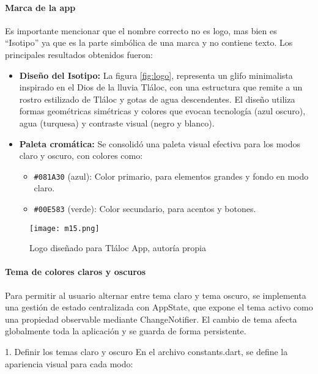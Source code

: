 \paragraph{Marca de la app}
Es importante mencionar que el nombre correcto no es logo, mas bien es ``Isotipo'' ya que es la parte simbólica de una marca y no contiene texto. Los principales resultados obtenidos fueron:

\begin{itemize}
  \item \textbf{Diseño del Isotipo:} La figura \ref{fig:logo}, representa un glifo minimalista inspirado en el Dios de la lluvia Tláloc, con una estructura que remite a un rostro estilizado de Tláloc y gotas de agua descendentes. El diseño utiliza formas geométricas simétricas y colores que evocan tecnología (azul oscuro), agua (turquesa) y contraste visual (negro y blanco).
  
  \item \textbf{Paleta cromática:} Se consolidó una paleta visual efectiva para los modos claro y oscuro, con colores como:
  \begin{itemize}
    \item \texttt{\#081A30} (azul): Color primario, para elementos grandes y fondo en modo claro.
    \item \texttt{\#00E583} (verde): Color secundario, para acentos y botones.
  \end{itemize} 
\end{itemize} 
\begin{figure}[h!]
\centering
  \texttt{[image: m15.png]}
  \caption{Logo diseñado para Tláloc App, autoría propia}
  \label{m15}
\end{figure}






\paragraph{Tema de colores claros y oscuros}


Para permitir al usuario alternar entre tema claro y tema oscuro, se implementa una gestión de estado centralizada con AppState, que expone el tema activo como una propiedad observable mediante ChangeNotifier. El cambio de tema afecta globalmente toda la aplicación y se guarda de forma persistente.

1. Definir los temas claro y oscuro
En el archivo constants.dart, se define la apariencia visual para cada modo:


